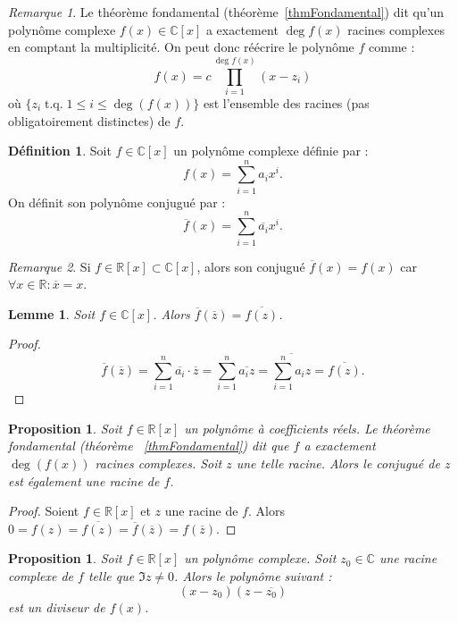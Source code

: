 \documentclass{article}
\DeclareMathOperator{\tq}{\text{ t.q. }}
\newcommand{\R}{\mathbb R}
\newcommand{\C}{\mathbb C}
\newtheorem{prp}[thm]{Proposition}
\newtheorem{lem}[thm]{Lemme}
\theoremstyle{definition}
\newtheorem{déf}[thm]{Définition}
\theoremstyle{remark}
\newtheorem*{rmq}{Remarque}
\begin{document}
		\begin{rmq} Le théorème fondamental (théorème~\ref{thmFondamental}) dit qu'un polynôme complexe $f(x) \in \C[x]$ a exactement $\deg f(x)$ racines complexes en comptant
		la multiplicité. On peut donc réécrire le polynôme $f$ comme : \[f(x) = c\prod_{i=1}^{\deg f(x)}(x-z_i)\] où $\{z_i \tq 1 \leq i \leq \deg(f(x))\}$ est l'ensemble des
		racines (pas obligatoirement distinctes) de $f$.\end{rmq}

		\begin{déf} Soit $f \in \C[x]$ un polynôme complexe définie par : \[f(x) = \sum_{i=1}^na_ix^i.\] On définit son polynôme conjugué par :
		\[\overline f(x) = \sum_{i=1}^n\overline {a_i}x^i.\] \end{déf}

		\begin{rmq} Si $f \in \R[x] \subset \C[x]$, alors son conjugué $\overline f(x) = f(x)$ car $\forall x \in \R : \overline x = x$. \end{rmq}

		\begin{lem} Soit $f \in \C[x]$. Alors $\overline f(\overline z) = \overline {f(z)}$. \end{lem}

		\begin{proof} \[\overline f(\overline z) = \sum_{i=1}^n\overline {a_i}\cdot\overline z = \sum_{i=1}^n\overline {a_iz} = \overline {\sum_{i=1}^na_iz} =
		\overline {f(z)}.\] \end{proof}

		\begin{prp} Soit $f \in \R[x]$ un polynôme à coefficients réels. Le théorème fondamental (théorème ~\ref{thmFondamental}) dit que $f$ a exactement $\deg(f(x))$ racines
		complexes. Soit $z$ une telle racine. Alors le conjugué de $z$ est également une racine de $f$. \end{prp}
		
		\begin{proof} Soient $f \in \R[x]$ et $z$ une racine de $f$. Alors $0 = f(z) = \overline {f(z)} = \overline f(\overline z) = f(\overline z)$. \end{proof}

		\begin{prp} Soit $f \in \R[x]$ un polynôme complexe. Soit $z_0 \in \C$ une racine complexe de $f$ telle que $\Im z \neq 0$. Alors le polynôme suivant :
		\[(x-z_0)(z-\overline {z_0})\] est un diviseur de $f(x)$. \end{prp}
\end{document}
